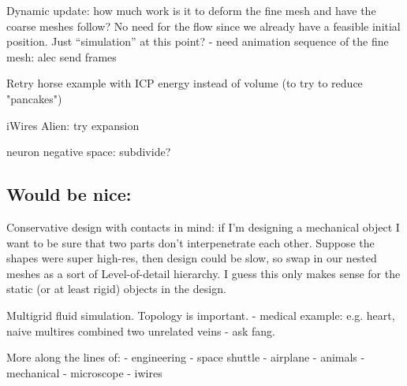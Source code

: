 Dynamic update: how much work is it to deform the fine mesh and have the coarse
meshes follow? No need for the flow since we already have a feasible initial
position. Just ``simulation'' at this point?
  - need animation sequence of the fine mesh: alec send frames


Retry horse example with ICP energy instead of volume (to try to reduce
"pancakes")

iWires Alien: try expansion 

neuron negative space: subdivide?

\subsection{Would be nice:}

Conservative design with contacts in mind: if I'm designing a mechanical object
I want to be sure that two parts don't interpenetrate each other. Suppose the
shapes were super high-res, then design could be slow, so swap in our nested
meshes as a sort of Level-of-detail hierarchy. I guess this only makes sense
for the static (or at least rigid) objects in the design.

Multigrid fluid simulation. Topology is important.
  - medical example: e.g. heart, naive multires combined two unrelated veins
  - ask fang.

More along the lines of:
  - engineering
    - space shuttle
    - airplane
  - animals
  - mechanical
    - microscope
    - iwires

